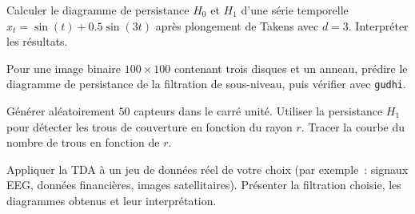 \begin{exercice}
Calculer le diagramme de persistance $H_0$ et $H_1$ d'une s\'erie
temporelle $x_t = \sin(t) + 0.5 \sin(3t)$ apr\`es plongement de
Takens avec $d = 3$. Interpr\'eter les r\'esultats.
\end{exercice}

\begin{exercice}
Pour une image binaire $100 \times 100$ contenant trois disques et
un anneau, pr\'edire le diagramme de persistance de la filtration
de sous-niveau, puis v\'erifier avec \texttt{gudhi}.
\end{exercice}

\begin{exercice}
G\'en\'erer al\'eatoirement $50$ capteurs dans le carr\'e unit\'e.
Utiliser la persistance $H_1$ pour d\'etecter les trous de couverture
en fonction du rayon $r$. Tracer la courbe du nombre de trous en
fonction de $r$.
\end{exercice}

\begin{exercice}[Projet]
Appliquer la TDA \`a un jeu de donn\'ees r\'eel de votre choix
(par exemple~: signaux EEG, donn\'ees financi\`eres, images
satellitaires). Pr\'esenter la filtration choisie, les diagrammes
obtenus et leur interpr\'etation.
\end{exercice}
